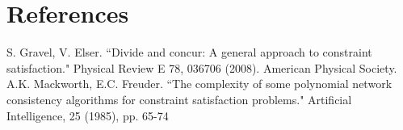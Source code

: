 \documentclass[letterpaper]{article}
\begin{document}
\section{References}

S. Gravel, V. Elser. ``Divide and concur: A general approach to constraint satisfaction." Physical Review E 78, 036706 (2008). American Physical Society.  \\

\noindent A.K. Mackworth, E.C. Freuder. ``The complexity of some polynomial network consistency algorithms for constraint satisfaction problems." Artificial Intelligence, 25 (1985), pp. 65-74
\end{document}

